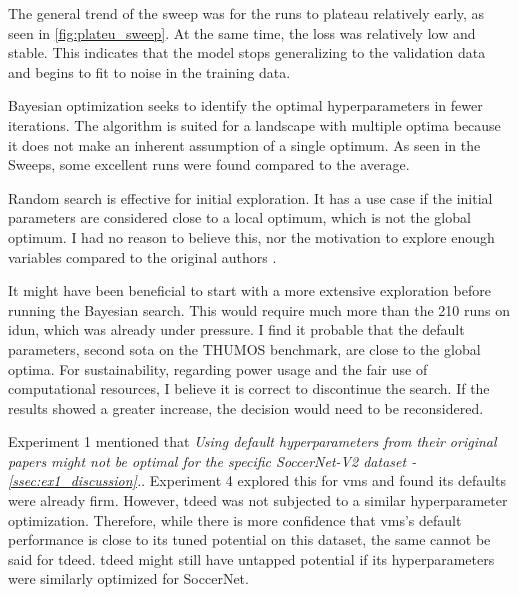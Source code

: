 The general trend of the sweep was for the runs to plateau relatively early, as seen in \autoref{fig:plateu_sweep}. At the same time, the loss was relatively low and stable. This indicates that the model stops generalizing to the validation data and begins to fit to noise in the training data.


Bayesian optimization seeks to identify the optimal hyperparameters in fewer iterations. The algorithm is suited for a landscape with multiple optima because it does not make an inherent assumption of a single optimum. As seen in the Sweeps, some excellent runs were found compared to the average. 

Random search is effective for initial exploration. It has a use case if the initial parameters are considered close to a local optimum, which is not the global optimum. I had no reason to believe this, nor the motivation to explore enough variables compared to the original authors \cite{li_videomamba_2024}.

It might have been beneficial to start with a more extensive exploration before running the Bayesian search. This would require much more than the 210 runs on \acrshort{idun}, which was already under pressure. I find it probable that the default parameters, second \acrshort{sota} on the THUMOS benchmark, are close to the global optima. For sustainability, regarding power usage and the fair use of computational resources, I believe it is correct to discontinue the search. If the results showed a greater increase, the decision would need to be reconsidered.


Experiment 1 mentioned that \textit{Using default hyperparameters from their original papers might not be optimal for the specific SoccerNet-V2 dataset - \cref{ssec:ex1_discussion}.}. Experiment 4 explored this for \acrshort{vms} and found its defaults were already firm. However, \acrshort{tdeed} was not subjected to a similar hyperparameter optimization. Therefore, while there is more confidence that \acrshort{vms}'s default performance is close to its tuned potential on this dataset, the same cannot be said for \acrshort{tdeed}. \acrshort{tdeed} might still have untapped potential if its hyperparameters were similarly optimized for SoccerNet.

